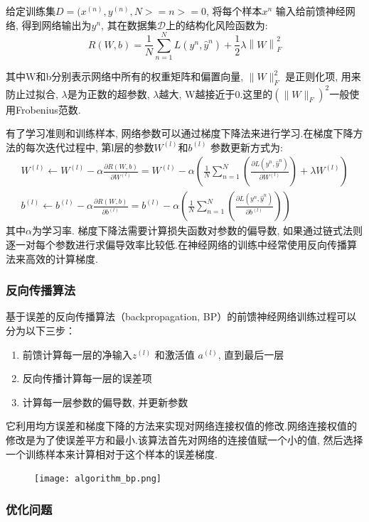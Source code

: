给定训练集$D={(x^{(n)}, y^{(n)},  N>=n>=0}$, 将每个样本$x^n$ 输入给前馈神经网络, 得到网络输出为$y^n$, 其在数据集$\mathcal{D}$上的结构化风险函数为:
$$R(W, b)=\frac{1}{N}\sum_{n=1}^{N} L(y^n, \hat{y}^n) + \frac{1}{2}\lambda \left \| W \right \|_F^2$$
 
其中W和b分别表示网络中所有的权重矩阵和偏置向量,  $\|W\|_F^2$ 是正则化项, 用来防止过拟合, $\lambda$是为正数的超参数, $\lambda$越大, W越接近于0.这里的$(\|W\|_F)^2$一般使用Frobenius范数.
 
有了学习准则和训练样本, 网络参数可以通过梯度下降法来进行学习.在梯度下降方法的每次迭代过程中, 第l层的参数$ W^{(l)} $和$ b^{(l)}$ 参数更新方式为:
\begin{gather*}
    W^{(l)} \leftarrow W^{(l)} - \alpha \frac{\partial R(W, b)}{\partial W^{(l)}}=W^{(l)} - \alpha ( \frac{1}{N} \sum_{n=1}^{N}(\frac{\partial L(y^n, \hat{y}^n)}{\partial W^{(l)}}) + \lambda W^{(l)} )\\b^{(l)} \leftarrow b^{(l)} - \alpha \frac{\partial R(W, b)}{\partial b^{(l)}}=b^{(l)} - \alpha ( \frac{1}{N} \sum_{n=1}^{N}(\frac{\partial L(y^n, \hat{y}^n)}{\partial b^{(l)}}) ) 
\end{gather*}
其中$\alpha$为学习率.
梯度下降法需要计算损失函数对参数的偏导数, 如果通过链式法则逐一对每个参数进行求偏导效率比较低.在神经网络的训练中经常使用反向传播算法来高效的计算梯度. 
\subsubsection{反向传播算法}
基于误差的反向传播算法（backpropagation, BP）的前馈神经网络训练过程可以分为以下三步：
\begin{enumerate} 
    \renewcommand{\labelenumi}{(\theenumi)}
\item 前馈计算每一层的净输入$z^{(l)}$ 和激活值 $a^{(l)}$, 直到最后一层
\item 反向传播计算每一层的误差项
\item 计算每一层参数的偏导数, 并更新参数
\end{enumerate}

它利用均方误差和梯度下降的方法来实现对网络连接权值的修改.网络连接权值的修改是为了使误差平方和最小.该算法首先对网络的连接值赋一个小的值, 然后选择一个训练样本来计算相对于这个样本的误差梯度.
\begin{figure}
    \centering
    \texttt{[image: algorithm\_bp.png]}
\end{figure} 

\subsubsection{优化问题}
